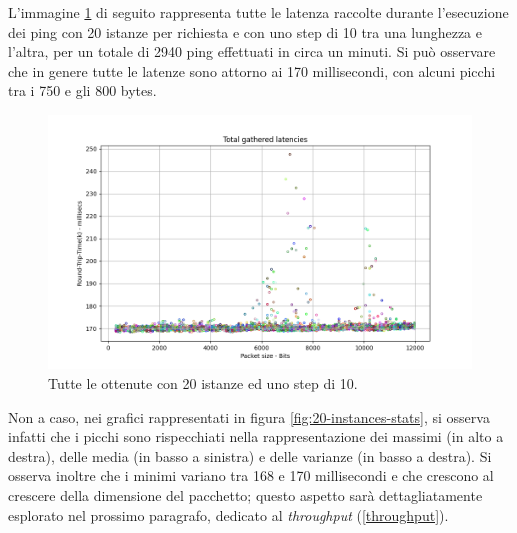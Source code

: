 L'immagine \ref{fig:20-instances-total} di seguito rappresenta tutte le latenza raccolte durante l'esecuzione dei ping con 20 istanze per richiesta e con uno step di 10 tra una lunghezza e l'altra, per un totale di 2940 ping effettuati in circa un minuti. Si può osservare che in genere tutte le latenze sono attorno ai 170 millisecondi, con alcuni picchi tra i 750 e gli 800 bytes.
\begin{figure}[h]
    \centering
    \includegraphics[width = .9\textwidth]{hw-2/report/imgs/20-instances/la-total-latencies.png}
    \caption{Tutte le ottenute con 20 istanze ed uno step di 10.}
    \label{fig:20-instances-total}
\end{figure}
Non a caso, nei grafici rappresentati in figura \ref{fig:20-instances-stats}, si osserva infatti che i picchi sono rispecchiati nella rappresentazione dei massimi (in alto a destra), delle media (in basso a sinistra) e delle varianze (in basso a destra). Si osserva inoltre che i minimi variano tra 168 e 170 millisecondi e che crescono al crescere della dimensione del pacchetto; questo aspetto sarà dettagliatamente esplorato nel prossimo paragrafo, dedicato al \textsl{throughput} (\ref{throughput}).
